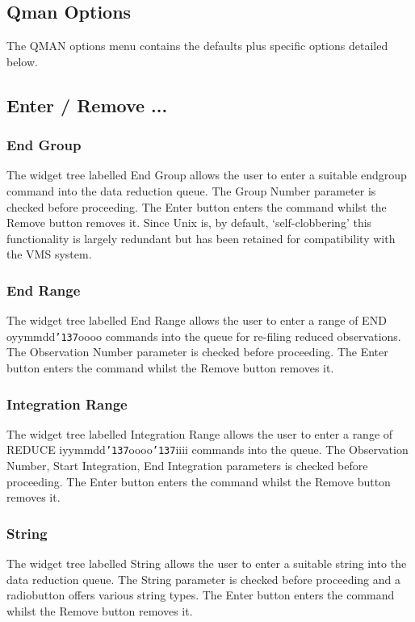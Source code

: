 \documentclass[a4paper]{book}
\renewcommand{\_}{{\tt\char'137}}
\begin{document}
\subsection{Qman Options}
The QMAN options menu contains the defaults plus specific options detailed below.

\subsection{Enter / Remove ...}
\subsubsection{End Group}
The widget tree labelled {\sf End Group} allows the user to enter a suitable
endgroup command into the data reduction queue. The {\sf Group Number} parameter
is checked before proceeding. The {\sf Enter} button enters the command whilst the
{\sf Remove} button removes it. Since Unix is, by default, `self-clobbering' this
functionality is largely redundant but has been retained for compatibility with the
VMS system.

\subsubsection{End Range}
The widget tree labelled {\sf End Range} allows the user to enter a range of
END oyymmdd\_oooo commands into the queue for re-filing reduced observations.
The {\sf Observation Number} parameter is checked before proceeding. The {\sf Enter}
button enters the command whilst the {\sf Remove} button removes it.

\subsubsection{Integration Range}
The widget tree labelled {\sf Integration Range} allows the user to enter a range
of REDUCE iyymmdd\_oooo\_iiii commands into the queue.
The {\sf Observation Number, Start Integration, End Integration} parameters
is checked before proceeding. The {\sf Enter} button enters the command whilst the
{\sf Remove} button removes it.

\subsubsection{String}
The widget tree labelled {\sf String} allows the user to enter a suitable
string into the data reduction queue. The {\sf String} parameter
is checked before proceeding and a radiobutton offers various string types.
The {\sf Enter} button enters the command whilst the {\sf Remove} button removes it.
\end{document}
